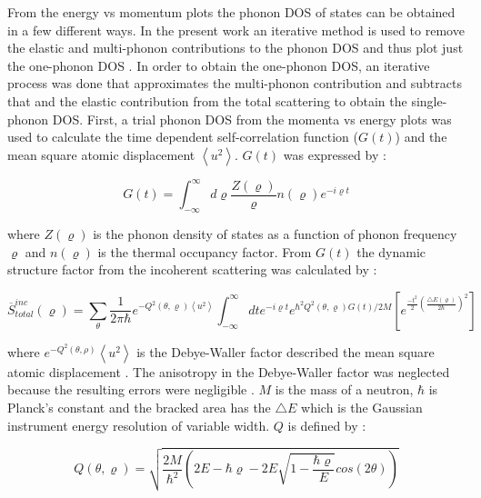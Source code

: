 From the energy vs momentum plots the phonon DOS of states can be obtained in a few different ways. In the present work an iterative method is used to remove the elastic and multi-phonon contributions to the phonon DOS and thus plot just the one-phonon DOS \cite{Fultz2009,Squires2012}. In order to obtain the one-phonon DOS, an iterative process was done that approximates the multi-phonon contribution and subtracts that and the elastic contribution from the total scattering to obtain the single-phonon DOS. First, a trial phonon DOS from the momenta vs energy plots was used to calculate the time dependent self-correlation function ($G(t)$) and the mean square atomic displacement $\left< u^{2} \right>$. $G(t)$ was expressed by \cite{Manley2001,Manley2002}:

\begin{equation}
\label{eq: td_selfcorrelation}
G (t) = \int_{- \infty}^{\infty} d \varrho \frac{Z(\varrho)}{\varrho} n(\varrho) e^{- i \varrho t}
\end{equation}


\noindent where $Z(\varrho)$ is the phonon density of states as a function of phonon frequency $\varrho$ and $n(\varrho)$ is the thermal occupancy factor. From $G(t)$  the dynamic structure factor from the incoherent scattering was calculated by \cite{Manley2001,Manley2002}:

\begin{equation}
\label{eq: S_total_inc}
\overline{S}_{total}^{inc} (\varrho) = \sum_{\theta} \frac{1}{2 \pi \hbar} e^{- Q^{2} (\theta, \varrho) \left<u^{2} \right>} \int_{-\infty}^{\infty} dte^{-i \varrho t} e^{\hbar^{2}Q^{2}(\theta, \varrho) G(t)/2M} \left[ e^{\frac{-t^{2}}{2} \left(\frac{\bigtriangleup E (\varrho)}{2\hbar} \right)^{2}} \right]
\end{equation}

\noindent where $e^{-Q^{2}\left(\theta,\rho \right) }\left< u^{2} \right>$ is the Debye-Waller factor described the mean square atomic displacement \cite{Squires2012}. The anisotropy in the Debye-Waller factor was neglected because the resulting errors were negligible \cite{Manley2001}.  $M$ is the mass of a neutron, $\hbar$ is Planck's constant and the bracked area has the $\bigtriangleup E$ which is the Gaussian instrument energy resolution of variable width. $Q$ is defined by \cite{Manley2001,Manley2002}:

\begin{equation}
\label{eq: Q}
Q(\theta, \varrho) = \sqrt{\frac{2M}{\hbar^{2}} \left( 2E - \hbar \varrho - 2E \sqrt{1-\frac{\hbar \varrho}{E}}cos(2\theta) \right)}
\end{equation}

